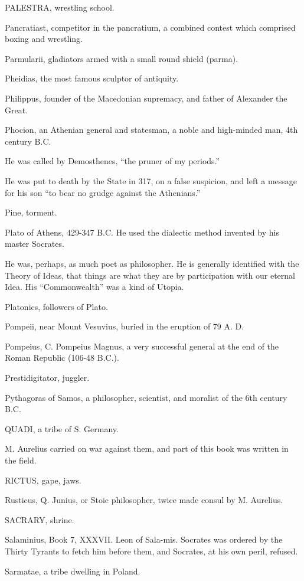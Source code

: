 PALESTRA, wrestling school.

Pancratiast, competitor in the pancratium, a combined contest which
comprised boxing and wrestling.

Parmularii, gladiators armed with a small round shield (parma).

Pheidias, the most famous sculptor of antiquity.

Philippus, founder of the Macedonian supremacy, and father of Alexander
the Great.

Phocion, an Athenian general and statesman, a noble and high-minded man,
4th century B.C.

He was called by Demosthenes, ``the pruner of my periods.''

He was put to death by the State in 317, on a false suspicion, and left a
message for his son ``to bear no grudge against the Athenians.''

Pine, torment.

Plato of Athens, 429-347 B.C. He used the dialectic method invented by his
master Socrates.

He was, perhaps, as much poet as philosopher. He is generally identified
with the Theory of Ideas, that things are what they are by participation
with our eternal Idea. His ``Commonwealth'' was a kind of Utopia.

Platonics, followers of Plato.

Pompeii, near Mount Vesuvius, buried in the eruption of 79 A. D.

Pompeius, C. Pompeius Magnus, a very successful general at the end of the
Roman Republic (106-48 B.C.).

Prestidigitator, juggler.

Pythagoras of Samos, a philosopher, scientist, and moralist of the 6th
century B.C.

QUADI, a tribe of S. Germany.

M. Aurelius carried on war against them, and part of this book was written
in the field.

RICTUS, gape, jaws.

Rusticus, Q. Junius, or Stoic philosopher, twice made consul by M.
Aurelius.

SACRARY, shrine.

Salaminius, Book 7, XXXVII. Leon of Sala-mis. Socrates was ordered by the
Thirty Tyrants to fetch him before them, and Socrates, at his own peril,
refused.

Sarmatae, a tribe dwelling in Poland.


